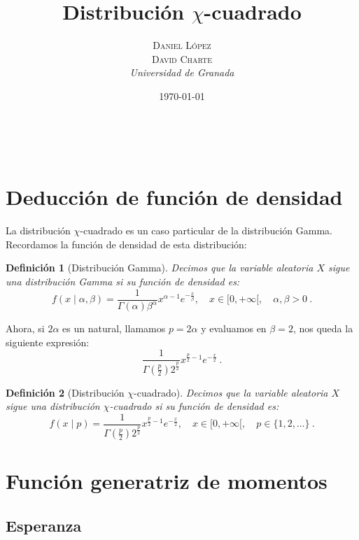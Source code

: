 \documentclass[a4paper, 10pt]{article} %
\title{\textbf{Distribución $\chi$-cuadrado}\\ %
\vspace{20 pt}
} %
\author{\textsc{Daniel López\\
David Charte} %
\\{\textit{Universidad de Granada}}} %
\date{\today} %
\makeatletter
\renewcommand{\maketitle}{ %
\begin{center} %
{\Huge\@title} %
\end{center}

\vspace{20pt} %

\begin{flushright} %
{\large\@author} %
\\\@date %

\vspace{40pt} %
\end{flushright}
\renewcommand{\baselinestretch}{0.5}

}
\newtheorem{definition}{Definición}[section]
\makeatother
\begin{document}
\maketitle
\tableofcontents
\setcounter{page}{1}
\pagebreak

\section{Deducción de función de densidad}
La distribución $\chi$-cuadrado es un caso particular de la distribución Gamma. Recordamos la función de densidad de esta distribución:

\begin{definition}[Distribución Gamma]
  Decimos que la variable aleatoria $X$ sigue una distribución Gamma si su función de densidad es:
  $$f(x\mid \alpha, \beta) = \frac 1 {\Gamma(\alpha)\beta^\alpha}x^{\alpha-1}e^{-\frac x \beta},\quad x\in[0,+\infty[,\quad \alpha,\beta>0~.$$
\end{definition}

Ahora, si $2\alpha$ es un natural, llamamos $p=2\alpha$ y evaluamos en $\beta=2$, nos queda la siguiente expresión:
$$\frac 1 {\Gamma(\frac p 2)2^{\frac p 2}}x^{\frac p 2-1}e^{-\frac x 2}~.$$

\begin{definition}[Distribución $\chi$-cuadrado]
  Decimos que la variable aleatoria $X$ sigue una distribución $\chi$-cuadrado si su función de densidad es:
  $$f(x\mid p) = \frac 1 {\Gamma(\frac p 2)2^{\frac p 2}}x^{\frac p 2-1}e^{-\frac x 2},\quad x\in[0,+\infty[,\quad p\in\{1,2,\dots\}~.$$
\end{definition}

\section{Función generatriz de momentos}

\subsection{Esperanza}
\end{document}
